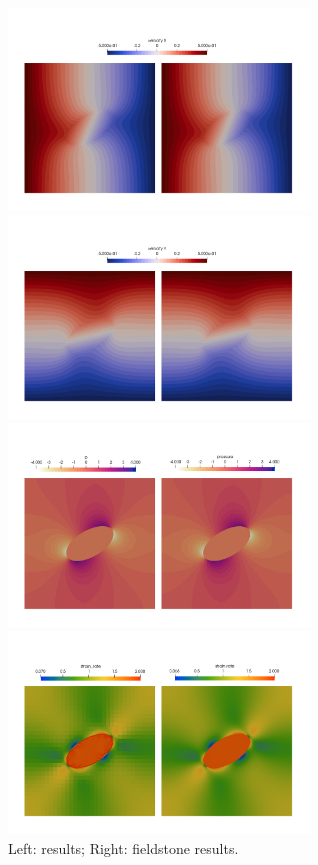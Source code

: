\begin{center}
\includegraphics[width=8cm]{python_codes/fieldstone_142/results/case2/aspect/u}
\includegraphics[width=8cm]{python_codes/fieldstone_142/results/case2/aspect/v}\\
\includegraphics[width=8cm]{python_codes/fieldstone_142/results/case2/aspect/press}
\includegraphics[width=8cm]{python_codes/fieldstone_142/results/case2/aspect/sr}\\
{\captionfont Left: \aspect results; Right: fieldstone results.}
\end{center}



